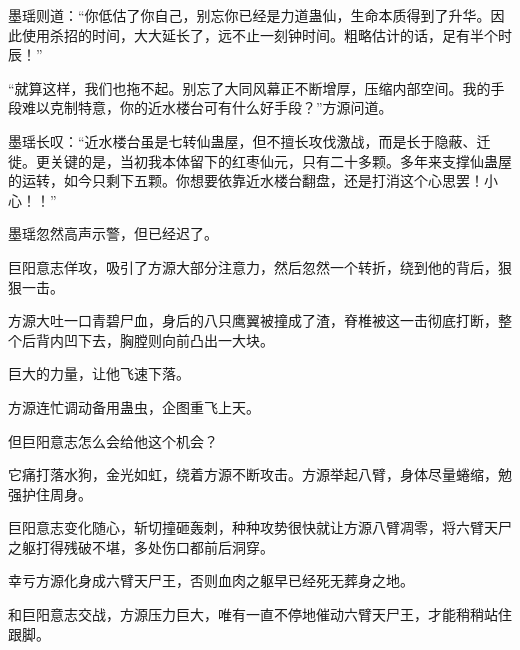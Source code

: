 \begin{this_body}
墨瑶则道：“你低估了你自己，别忘你已经是力道蛊仙，生命本质得到了升华。因此使用杀招的时间，大大延长了，远不止一刻钟时间。粗略估计的话，足有半个时辰！”

“就算这样，我们也拖不起。别忘了大同风幕正不断增厚，压缩内部空间。我的手段难以克制特意，你的近水楼台可有什么好手段？”方源问道。

墨瑶长叹：“近水楼台虽是七转仙蛊屋，但不擅长攻伐激战，而是长于隐蔽、迁徙。更关键的是，当初我本体留下的红枣仙元，只有二十多颗。多年来支撑仙蛊屋的运转，如今只剩下五颗。你想要依靠近水楼台翻盘，还是打消这个心思罢！小心！！”

墨瑶忽然高声示警，但已经迟了。

巨阳意志佯攻，吸引了方源大部分注意力，然后忽然一个转折，绕到他的背后，狠狠一击。

方源大吐一口青碧尸血，身后的八只鹰翼被撞成了渣，脊椎被这一击彻底打断，整个后背内凹下去，胸膛则向前凸出一大块。

巨大的力量，让他飞速下落。

方源连忙调动备用蛊虫，企图重飞上天。

但巨阳意志怎么会给他这个机会？

它痛打落水狗，金光如虹，绕着方源不断攻击。方源举起八臂，身体尽量蜷缩，勉强护住周身。

巨阳意志变化随心，斩切撞砸轰刺，种种攻势很快就让方源八臂凋零，将六臂天尸之躯打得残破不堪，多处伤口都前后洞穿。

幸亏方源化身成六臂天尸王，否则血肉之躯早已经死无葬身之地。

和巨阳意志交战，方源压力巨大，唯有一直不停地催动六臂天尸王，才能稍稍站住跟脚。

\end{this_body}

